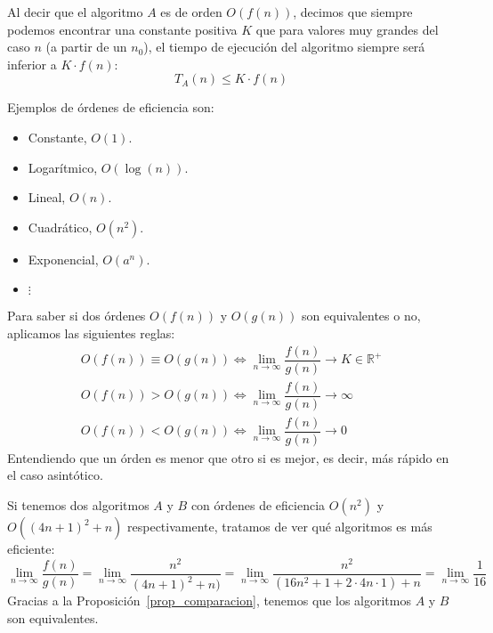 Al decir que el algoritmo $A$ es de orden $O(f(n))$, decimos que siempre podemos encontrar una constante positiva $K$ que para valores muy grandes del caso $n$ (a partir de un $n_0$), el tiempo de ejecución del algoritmo siempre será inferior a $K \cdot f(n)$:
\begin{equation*}
T_A(n) \leq K \cdot f(n)
\end{equation*}

Ejemplos de órdenes de eficiencia son:
\begin{itemize}
    \item Constante, $O(1)$.
    \item Logarítmico, $O(\log(n))$.
    \item Lineal, $O(n)$.
    \item Cuadrático, $O(n^2)$.
    \item Exponencial, $O(a^n)$.
    \item $\vdots$
\end{itemize}

\begin{prop}\label{prop_comparacion}
Para saber si dos órdenes $O(f(n))$ y $O(g(n))$ son equivalentes o no, aplicamos las siguientes reglas:
\begin{gather*}
O(f(n)) \equiv O(g(n)) \Leftrightarrow \lim_{n \to \infty} \dfrac{f(n)}{g(n)} \rightarrow K \in \mathbb{R}^{+}\\
O(f(n)) > O(g(n)) \Leftrightarrow \lim_{n \to \infty} \dfrac{f(n)}{g(n)} \rightarrow \infty\\
O(f(n)) < O(g(n)) \Leftrightarrow \lim_{n \to \infty} \dfrac{f(n)}{g(n)} \rightarrow 0
\end{gather*}
Entendiendo que un órden es menor que otro si es mejor, es decir, más rápido en el caso asintótico.
\end{prop}

\begin{ejemplo}
Si tenemos dos algoritmos $A$ y $B$ con órdenes de eficiencia $O(n^2)$ y $O((4n+1)^2+n)$ respectivamente, tratamos de ver qué algoritmos es más eficiente:
\begin{equation*}
\lim_{n\to \infty} \dfrac{f(n)}{g(n)} = \lim_{n\to\infty}\dfrac{n^2}{(4n+1)^2+n)} = \lim_{n\to\infty}\dfrac{n^2}{(16n^2 +1+2\cdot 4n\cdot 1)+n} = \lim_{n\to\infty}\dfrac{1}{16}
\end{equation*}
Gracias a la Proposición~\ref{prop_comparacion}, tenemos que los algoritmos $A$ y $B$ son equivalentes.
\end{ejemplo}

